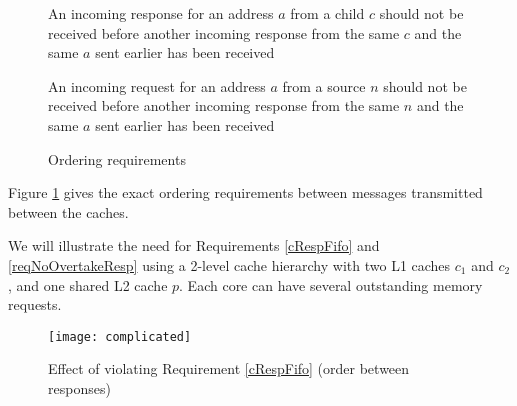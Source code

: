 

\begin{figure}\small
\begin{requirement}
An incoming response for an address $a$ from a child $c$ should not be
received before another incoming response from the same $c$ and the
same $a$ sent earlier has been received\label{cRespFifo}
\end{requirement}
\begin{requirement}
An incoming request for an address $a$ from a source $n$ should not be
received before another incoming response from the same $n$ and the
same $a$ sent earlier has been received\label{reqNoOvertakeResp}
\end{requirement}
\caption{Ordering requirements}
\label{order}
\end{figure}

Figure \ref{order} gives the exact ordering
requirements between messages transmitted between the caches.

We will illustrate the need for Requirements \ref{cRespFifo} and
\ref{reqNoOvertakeResp} using a 2-level cache hierarchy with two L1 caches $c_1$ and
$c_2$, and one shared L2 cache $p$. Each core can have several outstanding
memory requests.

\begin{figure}
\centering
\texttt{[image: complicated]}
\caption{Effect of violating Requirement \ref{cRespFifo} (order between responses)}
\label{complicated}
\end{figure}

